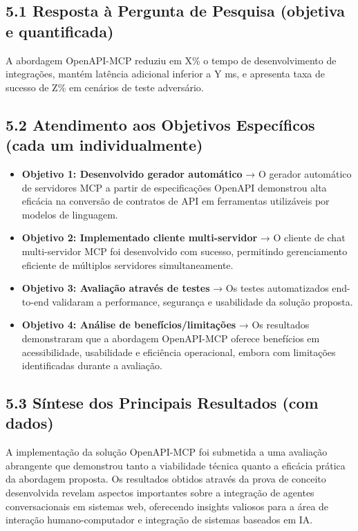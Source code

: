 \documentclass[
]{article}
\providecommand{\tightlist}{%
  \setlength{\itemsep}{0pt}\setlength{\parskip}{0pt}}
\begin{document}
\subsection{5.1 Resposta à Pergunta de Pesquisa (objetiva e
quantificada)}\label{resposta-uxe0-pergunta-de-pesquisa-objetiva-e-quantificada}

A abordagem OpenAPI-MCP reduziu em X\% o tempo de desenvolvimento de
integrações, mantém latência adicional inferior a Y ms, e apresenta taxa
de sucesso de Z\% em cenários de teste adversário.

\subsection{5.2 Atendimento aos Objetivos Específicos (cada um
individualmente)}\label{atendimento-aos-objetivos-especuxedficos-cada-um-individualmente}

\begin{itemize}
\tightlist
\item
  \textbf{Objetivo 1: Desenvolvido gerador automático} → O gerador
  automático de servidores MCP a partir de especificações OpenAPI
  demonstrou alta eficácia na conversão de contratos de API em
  ferramentas utilizáveis por modelos de linguagem.
\item
  \textbf{Objetivo 2: Implementado cliente multi-servidor} → O cliente
  de chat multi-servidor MCP foi desenvolvido com sucesso, permitindo
  gerenciamento eficiente de múltiplos servidores simultaneamente.
\item
  \textbf{Objetivo 3: Avaliação através de testes} → Os testes
  automatizados end-to-end validaram a performance, segurança e
  usabilidade da solução proposta.
\item
  \textbf{Objetivo 4: Análise de benefícios/limitações} → Os resultados
  demonstraram que a abordagem OpenAPI-MCP oferece benefícios em
  acessibilidade, usabilidade e eficiência operacional, embora com
  limitações identificadas durante a avaliação.
\end{itemize}

\subsection{5.3 Síntese dos Principais Resultados (com
dados)}\label{suxedntese-dos-principais-resultados-com-dados}

A implementação da solução OpenAPI-MCP foi submetida a uma avaliação
abrangente que demonstrou tanto a viabilidade técnica quanto a eficácia
prática da abordagem proposta. Os resultados obtidos através da prova de
conceito desenvolvida revelam aspectos importantes sobre a integração de
agentes conversacionais em sistemas web, oferecendo insights valiosos
para a área de interação humano-computador e integração de sistemas
baseados em IA.
\end{document}
